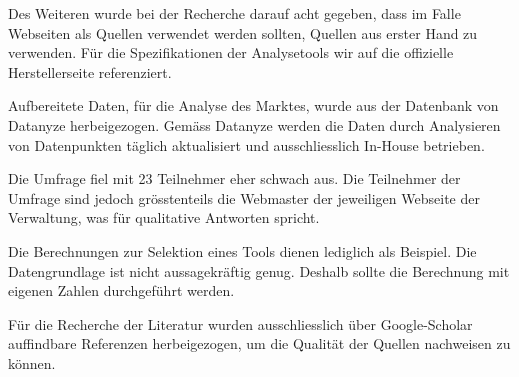 Des Weiteren wurde bei der Recherche darauf acht gegeben, dass im Falle Webseiten als Quellen verwendet werden sollten, Quellen aus erster Hand zu verwenden. Für die Spezifikationen der Analysetools wir auf die offizielle Herstellerseite referenziert.

Aufbereitete Daten, für die Analyse des Marktes, wurde aus der Datenbank von Datanyze \parencite{datanyzeSwitzerlandWebanalytics} herbeigezogen. Gemäss Datanyze \parencite{datanyzeFAQ} werden die Daten durch Analysieren von Datenpunkten täglich aktualisiert und ausschliesslich In-House betrieben.

Die Umfrage fiel mit 23 Teilnehmer eher schwach aus. Die Teilnehmer der Umfrage sind jedoch grösstenteils die Webmaster der jeweiligen Webseite der Verwaltung, was für qualitative Antworten spricht.

Die Berechnungen zur Selektion eines Tools dienen lediglich als Beispiel. Die Datengrundlage ist nicht aussagekräftig genug. Deshalb sollte die Berechnung mit eigenen Zahlen durchgeführt werden. 

Für die Recherche der Literatur wurden ausschliesslich über Google-Scholar auffindbare Referenzen herbeigezogen, um die Qualität der Quellen nachweisen zu können.


